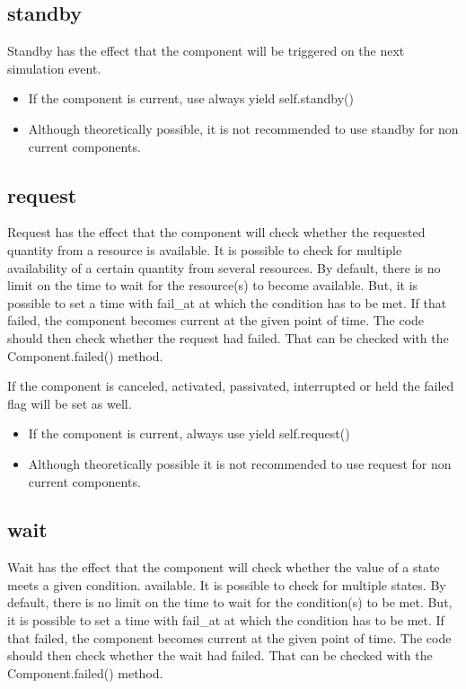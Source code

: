 \documentclass[letterpaper,10pt,english]{sphinxmanual}
\begin{document}
\subsection{standby}
\label{\detokenize{Component:standby}}
Standby has the effect that the component will be triggered on the next simulation event.
\begin{itemize}
\item {} 
If the component is current, use always yield self.standby()

\item {} 
Although theoretically possible, it is not recommended to use standby for non current components.

\end{itemize}


\subsection{request}
\label{\detokenize{Component:request}}
Request has the effect that the component will check whether the requested quantity from a resource is available. It is
possible to check for multiple availability of a certain quantity from several resources.
By default, there is no limit on the time to wait for the resource(s) to become available. But, it is possible to set
a time with fail\_at at which the condition has to be met. If that failed, the component becomes current at the given point of time.
The code should then check whether the request had failed. That can be checked with the Component.failed() method.

If the component is canceled, activated, passivated, interrupted or held the failed flag will be set as well.
\begin{itemize}
\item {} 
If the component is current, always use yield self.request()

\item {} 
Although theoretically possible it is not recommended to use request for non current components.

\end{itemize}


\subsection{wait}
\label{\detokenize{Component:wait}}
Wait has the effect that the component will check whether the value of a state meets a given condition.
available. It is
possible to check for multiple states.
By default, there is no limit on the time to wait for the condition(s) to be met. But, it is possible to set
a time with fail\_at at which the condition has to be met. If that failed, the component becomes current at the given point of time.
The code should then check whether the wait had failed. That can be checked with the Component.failed() method.
\end{document}

